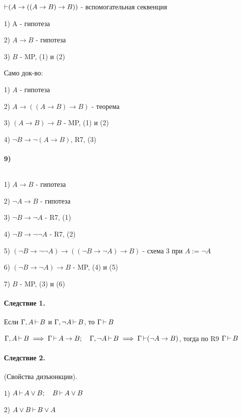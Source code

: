 \begin{myproof}
$\operatorname{\vdash} (A \to ((A \to B) \to B))$ - вспомогательная секвенция

1) A - гипотеза

2) $A \to B$ - гипотеза

3) $B$ - MP, (1) и (2)

Само док-во:

1) $A$ - гипотеза

2)  $A \to ((A \to B) \to B)$ - теорема

3) $(A \to B) \to B$ - MP, (1) и (2)

4) $\lnot B \to \lnot(A \to B)$, R7, (3)

\paragraph*{9)} ${}$ \newline

1) $A \to B$ - гипотеза

2) $\lnot A \to B$ - гипотеза

3) $\lnot B \to \lnot A$ - R7, (1)

4) $\lnot B \to \lnot\lnot A$ - R7, (2)

5) $(\lnot B \to \lnot\lnot A) \to ((\lnot B \to \lnot A) \to B)$ - схема 3 при $A :=\lnot A$

6)  $(\lnot B \to \lnot A) \to B$ - MP, (4) и (5) 

7) $B$ - MP, (3) и (6)

\end{myproof}

\paragraph*{Следствие 1.}
Если $\Gamma,A \operatorname{\vdash} B$ и  $\Gamma,\lnot A \operatorname{\vdash} B$, то  $\Gamma \operatorname{\vdash} B$
\begin{myproof}
$\Gamma,A\operatorname{\vdash} B \implies\Gamma \operatorname{\vdash} A \to B; \quad \Gamma,\lnot A\operatorname{\vdash} B \implies \Gamma \operatorname{\vdash}(\lnot
A \to B)$, тогда по R9 $\Gamma \operatorname{\vdash} B$
\end{myproof}


\paragraph*{Следствие 2.} (Свойства дизъюнкции).

1) $A \operatorname{\vdash} A \lor B; \quad B \operatorname{\vdash} A \lor B$ 

2) $A \lor B \operatorname{\vdash} B \lor A$

